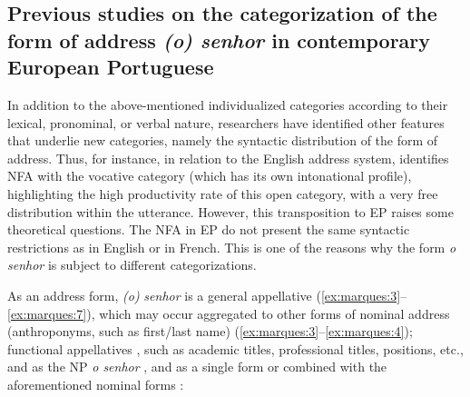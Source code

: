 \documentclass[output=paper]{langscibook}
\begin{document}
\subsection{Previous studies on the categorization of the form of address \textit{(o) senhor} in contemporary European Portuguese}\label{sec:marques:2.2}

In addition to the above{}-mentioned individualized categories according to their lexical, pronominal, or verbal nature, researchers have identified other features that underlie new categories, namely the syntactic distribution of the form of address. Thus, for instance, in relation to the English address system, \citet[182]{Formentelli2009} identifies NFA with the vocative category (which has its own intonational profile), highlighting the high productivity rate of this open category, with a very free distribution within the utterance. However, this transposition to EP raises some theoretical questions. The NFA in EP do not present the same syntactic restrictions as in English or in French. This is one of the reasons why the form \textit{o senhor} is subject to different categorizations.



As an address form, \textit{(o)} \textit{senhor} is a general appellative (\ref{ex:marques:3}–\ref{ex:marques:7}), which may occur aggregated to other forms of nominal address (anthroponyms, such as first/last name) (\ref{ex:marques:3}–\ref{ex:marques:4}); functional appellatives , such as academic titles, professional titles, positions, etc., and as the NP \textit{o senhor} , and as a single form or combined with the aforementioned nominal forms :
\end{document}
